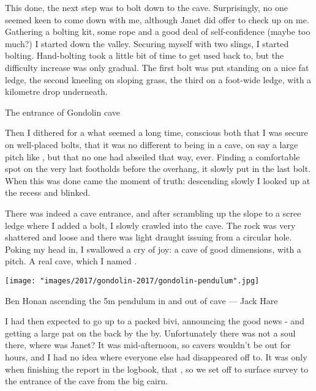 This done, the next step was to bolt down to the cave. Surprisingly, no one seemed keen to come down with me, although Janet did offer to check up on me. Gathering a bolting kit, some rope and a good deal of self-confidence (maybe too much?) I started down the valley. Securing myself with two slings, I started bolting. Hand-bolting took a little bit of time to get used back to, but the difficulty increase was only gradual. The first bolt was put standing on a nice fat ledge, the second kneeling on sloping grass, the third on a foot-wide ledge, with a kilometre drop underneath.

\begin{marginfigure}
    \caption{The entrance of Gondolin cave}
    \label{}
\end{marginfigure}

Then I dithered for a what seemed a long time, conscious both that I was secure on well-placed bolts, that it was no different to being in a cave, on say a large pitch like , but that no one had abseiled that way, ever. Finding a comfortable spot on the very last footholds before the overhang, it slowly put in the last bolt. When this was done came the moment of truth: descending slowly I looked up at the recess and blinked.

There was indeed a cave entrance, and after scrambling up the slope to a scree ledge where I added a bolt, I slowly crawled into the cave. The rock was very shattered and loose and there was light draught issuing from a circular hole. Poking my head in, I swallowed a cry of joy: a cave of good dimensions, with a pitch. A real cave, which I named .

\begin{pagefigure}
\checkoddpage \ifoddpage \forcerectofloat \else \forceversofloat \fi
\centering
        \texttt{[image: "images/2017/gondolin-2017/gondolin-pendulum".jpg]}
     \label{gondolin pendulum}
    \caption{ Ben Honan ascending the 5m pendulum in and out of  cave --- Jack Hare }
\end{pagefigure}

I had then expected to go up to a packed bivi, announcing the good news - and getting a large pat on the back by the by. Unfortunately there was not a soul there, where was Janet? It was mid-afternoon, so cavers wouldn't be out for hours, and I had no idea where everyone else had disappeared off to. It was only when finishing the report in the logbook, that , so we set off to surface survey to the entrance of the cave from the big cairn. 

